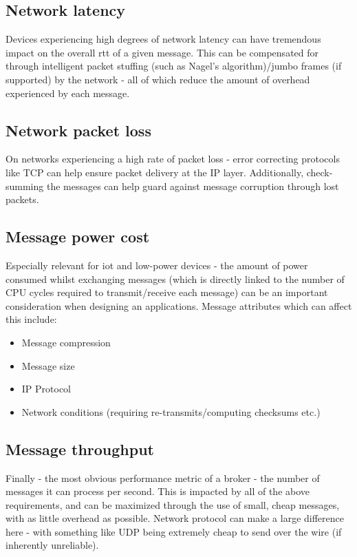 \subsection{Network latency}
\label{sub:Network latency}

Devices experiencing high degrees of network latency can have tremendous impact
on the overall \gls{rtt} of a given message. This can be compensated for through
intelligent packet stuffing (such as Nagel's algorithm)/jumbo frames (if supported)
by the network - all of which reduce the amount of overhead experienced by each
message.

\subsection{Network packet loss}
\label{sub:Network packet loss}

On networks experiencing a high rate of packet loss - error correcting protocols
like TCP can help ensure packet delivery at the IP layer. Additionally,
check-summing the messages can help guard against message corruption through lost
packets.

\subsection{Message power cost}
\label{sub:Message power cost}

Especially relevant for \gls{iot} and low-power devices - the amount of power
consumed whilst exchanging messages (which is directly linked to the number of
CPU cycles required to transmit/receive each message) can be an important
consideration when designing an applications. Message attributes which can
affect this include:

\begin{itemize}
  \item Message compression
  \item Message size
  \item IP Protocol
  \item Network conditions (requiring re-transmits/computing checksums etc.)
\end{itemize}

\subsection{Message throughput}
\label{sub:Message throughput}

Finally - the most obvious performance metric of a broker - the number of messages
it can process per second. This is impacted by all of the above requirements,
and can be maximized through the use of small, cheap messages, with as little
overhead as possible. Network protocol can make a large difference here - with
something like UDP being extremely cheap to send over the wire
(if inherently unreliable).

